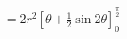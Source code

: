 \documentclass[preview]{standalone}
\begin{document}
\begin{align*}
=2r^{2}\left[\theta + \frac{1}{2}\sin2\theta\right]_0^\frac{\pi}{2}
\end{align*}
\end{document}
